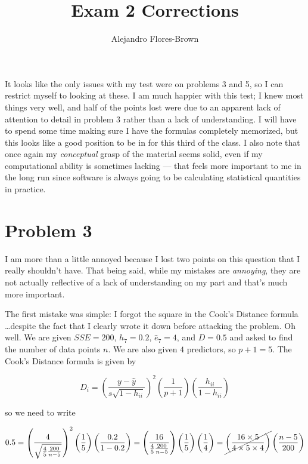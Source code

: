 \documentclass[12pt, letterpaper]{article}
\title{Exam 2 Corrections}
\author{Alejandro Flores-Brown}
\begin{document}
    \maketitle

    It looks like the only issues with my test were on problems 3 and 5, so I can restrict myself to looking at these. I am much happier with this test; I knew most things very well, and half of the points lost were due to an apparent lack of attention to detail in problem 3 rather than a lack of understanding. I will have to spend some time making sure I have the formulas completely memorized, but this looks like a good position to be in for this third of the class. I also note that once again my \emph{conceptual} grasp of the material seems solid, even if my computational ability is sometimes lacking --- that feels more important to me in the long run since software is always going to be calculating statistical quantities in practice.

    \section{Problem 3}

    I am more than a little annoyed because I lost two points on this question that I really shouldn't have. That being said, while my mistakes are \emph{annoying}, they are not actually reflective of a lack of understanding on my part and that's much more important.

    The first mistake was simple: I forgot the square in the Cook's Distance formula \dots despite the fact that I clearly wrote it down before attacking the problem. Oh well. We are given \(SSE = 200\), \(h_7 = 0.2\), \(\hat{e}_7 = 4\), and \(D = 0.5\) and asked to find the number of data points \(n\). We are also given \(4\) predictors, so \(p+1 = 5\). The Cook's Distance formula is given by

    \[ D_i = \left( \frac{y - \hat{y}}{s \sqrt{1 - h_{ii}}} \right)^2 \left(\frac{1}{p+1}\right) \left(\frac{h_{ii}}{1 - h_{ii}}\right)    \]

    so we need to write

    \[ 0.5 = \left( \frac{4}{\sqrt{\frac{4}{5} \frac{200}{n - 5}}} \right)^2 \left( \frac{1}{5} \right) \left( \frac{0.2}{1 - 0.2} \right) = \left( \frac{16}{\frac{4}{5} \frac{200}{n - 5}} \right) \left( \frac{1}{5} \right) \left( \frac{1}{4} \right) = \cancel{\left(\frac{16 \times 5}{4 \times 5 \times 4}\right)} \left(\frac{n - 5}{200}\right)     \]
\end{document}
